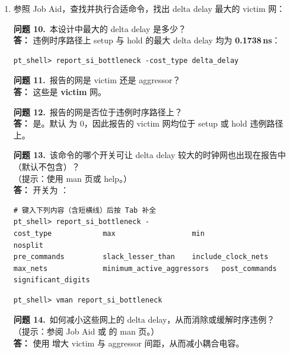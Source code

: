 \begin{enumerate}
\begin{noteBox}
注意：该 hold 路径上网延迟可能为负，但应关注的 stage delay（有意义延迟数值）为正。
\end{noteBox}

  \item 参照 Job Aid，查找并执行合适命令，找出 delta delay 最大的 victim 网：
\begin{questionBox}
\textbf{问题 10.}\ 本设计中最大的 delta delay 是多少？\\[0.35em]
\textbf{答：} 违例时序路径上 setup 与 hold 的最大 delta delay 均为 \textbf{0.1738\,ns}：
\begin{lstlisting}
pt_shell> report_si_bottleneck -cost_type delta_delay
\end{lstlisting}

\textbf{问题 11.}\ 报告的网是 victim 还是 aggressor？\\[0.35em]
\textbf{答：} 这些是 \textbf{victim} 网。

\textbf{问题 12.}\ 报告的网是否位于违例时序路径上？\\[0.35em]
\textbf{答：} 是。默认  为 0，因此报告的 victim 网均位于 setup 或 hold 违例路径上。
\end{questionBox}

\begin{questionBox}
\textbf{问题 13.}\ 该命令的哪个开关可让 delta delay 较大的时钟网也出现在报告中（默认不包含）？\\
（提示：使用 man 页或 help。）\\[0.35em]
\textbf{答：} 开关为 ：
\begin{lstlisting}
# 键入下列内容（含短横线）后按 Tab 补全
pt_shell> report_si_bottleneck -
cost_type            max                  min                  nosplit
pre_commands         slack_lesser_than    include_clock_nets
max_nets             minimum_active_aggressors   post_commands
significant_digits
\end{lstlisting}
\end{questionBox}

\begin{lstlisting}
pt_shell> vman report_si_bottleneck
\end{lstlisting}

\begin{questionBox}
\textbf{问题 14.}\ 如何减小这些网上的 delta delay，从而消除或缓解时序违例？\\
（提示：参阅 Job Aid 或  的 man 页。）\\[0.35em]
\textbf{答：} 使用  增大 victim 与 aggressor 间距，从而减小耦合电容。
\end{questionBox}


\end{enumerate}
